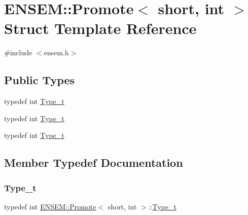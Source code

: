 \hypertarget{structENSEM_1_1Promote_3_01short_00_01int_01_4}{}\section{E\+N\+S\+EM\+:\+:Promote$<$ short, int $>$ Struct Template Reference}
\label{structENSEM_1_1Promote_3_01short_00_01int_01_4}


{\ttfamily \#include $<$ensem.\+h$>$}

\subsection*{Public Types}
\begin{DoxyCompactItemize}
\item 
typedef int \mbox{\hyperlink{structENSEM_1_1Promote_3_01short_00_01int_01_4_a6fb77c2428a4d51c4da789877c5a6e28}{Type\+\_\+t}}
\item 
typedef int \mbox{\hyperlink{structENSEM_1_1Promote_3_01short_00_01int_01_4_a6fb77c2428a4d51c4da789877c5a6e28}{Type\+\_\+t}}
\item 
typedef int \mbox{\hyperlink{structENSEM_1_1Promote_3_01short_00_01int_01_4_a6fb77c2428a4d51c4da789877c5a6e28}{Type\+\_\+t}}
\end{DoxyCompactItemize}


\subsection{Member Typedef Documentation}
\mbox{\label{structENSEM_1_1Promote_3_01short_00_01int_01_4_a6fb77c2428a4d51c4da789877c5a6e28}} 
\subsubsection{\texorpdfstring{Type\_t}{Type\_t}\hspace{0.1cm}{\footnotesize\ttfamily [1/3]}}
{\footnotesize\ttfamily typedef int \mbox{\hyperlink{structENSEM_1_1Promote}{E\+N\+S\+E\+M\+::\+Promote}}$<$ short, int $>$\+::\mbox{\hyperlink{structENSEM_1_1Promote_3_01short_00_01int_01_4_a6fb77c2428a4d51c4da789877c5a6e28}{Type\+\_\+t}}}

\mbox{\label{structENSEM_1_1Promote_3_01short_00_01int_01_4_a6fb77c2428a4d51c4da789877c5a6e28}} 
